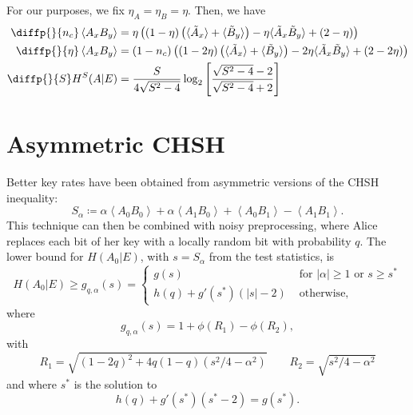 \documentclass[10pt, a4paper]{article}
\newcommand{\abs}[1]{\left\lvert#1\right\rvert}
\newcommand{\?}{\mathrel{?}} %
\newcommand{\angleb}[1]{\left\langle #1 \right\rangle} %
\numberwithin{equation}{section} %
\theoremstyle{definition}
\theoremstyle{plain}
\theoremstyle{plain}
\begin{document}
    For our purposes, we fix \(\eta_A = \eta_B = \eta\). Then, we have
    \begin{align*}
      \diffp{}{{n_c}} \angleb{A_x B_y} &= \eta \left( \left(1-\eta\right) \left(\langle\tilde{A}_x\rangle + \langle\tilde{B}_y\rangle\right) - \eta \langle\tilde{A}_x\tilde{B}_y\rangle + \left(2 - \eta\right) \right) \\
      \diffp{}{{\eta}} \angleb{A_x B_y} &= \left(1 - n_{c}\right) \left( \left(1-2\eta\right) \left(\langle\tilde{A}_x\rangle+\langle\tilde{B}_y\rangle\right) - 2\eta \langle\tilde{A}_x\tilde{B}_y\rangle + (2-2\eta) \right) \\
      \diffp{}{S} H^S(A|E) &= \frac{S}{4\sqrt{S^2-4}} \log_2 \left[ \frac{\sqrt{S^2-4}-2}{\sqrt{S^2-4}+2} \right]
    \end{align*}

    \section{Asymmetric CHSH}

    Better key rates have been obtained from asymmetric versions of the CHSH inequality:
    \begin{equation}
      S_{\alpha} \coloneqq \alpha\angleb{A_0 B_0} + \alpha\angleb{A_1 B_0} + \angleb{A_0 B_1} - \angleb{A_1 B_1}.
    \end{equation}
    This technique can then be combined with noisy preprocessing, where Alice replaces each bit of her key with a locally random bit with probability \(q\). The lower bound for \(H(A_0|E)\), with \(s = S_{\alpha}\) from the test statistics, is
    \[ H(A_0|E) \geq g_{q,\alpha}(s) = \begin{cases}
      g(s) & \text{ for } \abs{\alpha} \geq 1 \text{ or } s \geq s^* \\
      h(q) + g'(s^*)(\abs{s}-2) & \text{ otherwise},
    \end{cases}
    \]
    where
    \begin{equation}
      g_{q,\alpha}(s) = 1 + \phi\left(R_1\right) - \phi\left(R_2\right),
    \end{equation}
    with
    \begin{equation} 
      R_1 = \sqrt{{(1-2q)}^2 + 4q(1-q)(s^2/4-\alpha^2)} \qquad R_2 = \sqrt{s^2/4-\alpha^2}
    \end{equation}
    and where \(s^*\) is the solution to
    \begin{equation}\label{eqn:sstar}
      h(q) + g'(s^*) (s^*-2) = g(s^*).
    \end{equation}
\end{document}
